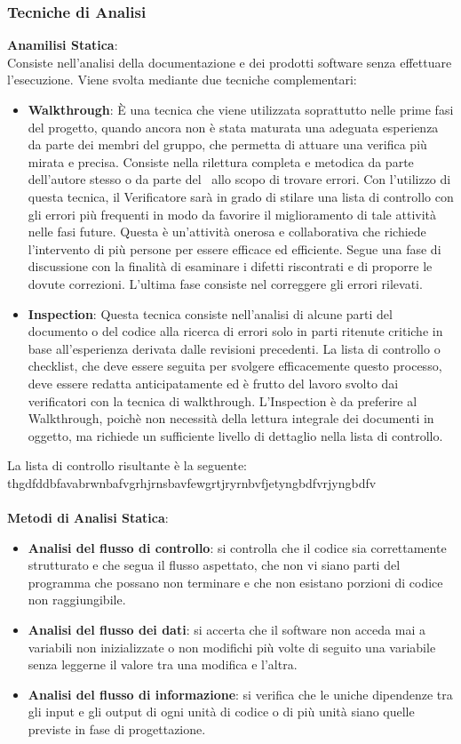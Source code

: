 \subsubsection{Tecniche di Analisi}
\textbf{Anamilisi Statica}:\medskip \\ 
Consiste nell'analisi della documentazione e dei prodotti software senza effettuare l'esecuzione. Viene svolta mediante due tecniche complementari:
\begin{itemize}
	\item \textbf{Walkthrough}:
	È una tecnica che viene utilizzata soprattutto nelle prime fasi del progetto, quando ancora non è stata maturata una adeguata esperienza da parte dei membri del gruppo, che permetta di attuare una verifica più mirata e precisa. Consiste nella rilettura completa e metodica da
	parte dell'autore stesso o da parte del \ruoloVerificatore\ allo scopo di trovare errori. Con l'utilizzo di questa tecnica, il Verificatore sarà in grado di stilare una lista di controllo con gli errori più frequenti in modo da favorire il miglioramento di tale attività nelle fasi future. Questa è un'attività onerosa e collaborativa che richiede l'intervento di più persone per essere efficace ed efficiente. Segue una fase di discussione con la finalità di esaminare i difetti riscontrati e di proporre le dovute correzioni. L'ultima fase consiste nel correggere gli errori rilevati.
	
	\item \textbf{Inspection}:
	Questa tecnica consiste nell'analisi di alcune parti del documento o del codice alla ricerca di errori solo in parti ritenute critiche in base all'esperienza derivata dalle revisioni precedenti. La lista di controllo o checklist, che deve essere seguita per svolgere efficacemente questo processo, deve essere redatta anticipatamente ed è frutto del lavoro svolto dai verificatori con la tecnica di walkthrough. L'Inspection è da preferire al Walkthrough, poichè  non necessità della lettura integrale dei documenti in oggetto, ma richiede un sufficiente livello di dettaglio nella lista di controllo.
	    
\end{itemize}
La lista di controllo risultante è la seguente:
thgdfddbfavabrwnbafvgrhjrnsbavfewgrtjryrnbvfjetyngbdfvrjyngbdfv \\ \\
\textbf{Metodi di Analisi Statica}:
\begin{itemize}
	\item \textbf{Analisi del flusso di controllo}: si controlla che il codice sia correttamente strutturato e che segua il flusso aspettato, che non vi siano parti del programma che possano non terminare e che non esistano porzioni di codice non raggiungibile.
	\item \textbf{Analisi del flusso dei dati}: si accerta che il software non acceda mai a variabili non inizializzate o non modifichi più volte di seguito una variabile senza leggerne il valore tra una modifica e l'altra.
	\item \textbf{Analisi del flusso di informazione}: si verifica che le uniche dipendenze tra gli input e gli output di ogni unità di codice o di più unità siano quelle previste in fase di progettazione.
\end{itemize}
